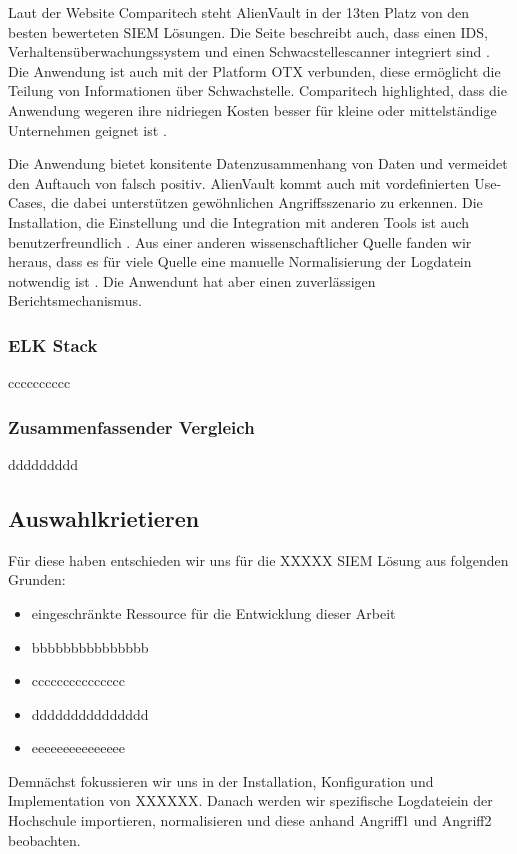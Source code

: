 Laut der Website Comparitech steht AlienVault in der 13ten Platz von den besten bewerteten \gls{SIEM} Lösungen. Die Seite beschreibt auch, dass einen \gls{IDS}, Verhaltensüberwachungssystem und einen Schwacstellescanner integriert sind . Die Anwendung ist auch mit der Platform \gls{OTX} verbunden, diese ermöglicht die Teilung von Informationen über Schwachstelle. Comparitech highlighted, dass die Anwendung wegeren ihre nidriegen Kosten besser für kleine oder mittelständige Unternehmen geignet ist \citep{comparitech_SIEM}. 

Die Anwendung bietet konsitente Datenzusammenhang von Daten und vermeidet den Auftauch von \gls{falsch positiv}. AlienVault kommt auch mit vordefinierten Use-Cases, die dabei unterstützen gewöhnlichen Angriffsszenario zu erkennen. Die Installation, die Einstellung und die Integration mit anderen Tools ist auch benutzerfreundlich \citep{Gomes_AV}. Aus einer anderen wissenschaftlicher Quelle fanden wir heraus, dass es für viele  Quelle eine manuelle Normalisierung der Logdatein notwendig ist \cite{Nabil_AV}. Die Anwendunt hat aber einen zuverlässigen Berichtsmechanismus.

\subsubsection{ELK Stack}
cccccccccc

\subsubsection{Zusammenfassender Vergleich}
ddddddddd

\subsection{Auswahlkrietieren}
Für diese haben entschieden wir uns für die XXXXX \gls{SIEM} Lösung aus folgenden Grunden:

\begin{itemize}[noitemsep]
   \item eingeschränkte Ressource für die Entwicklung dieser Arbeit
   \item bbbbbbbbbbbbbbb
   \item ccccccccccccccc
   \item ddddddddddddddd
   \item eeeeeeeeeeeeeee
\end{itemize}

Demnächst fokussieren wir uns in der Installation, Konfiguration und Implementation von XXXXXX. Danach werden wir spezifische Logdateiein der Hochschule importieren, normalisieren und diese anhand Angriff1 und Angriff2 beobachten.